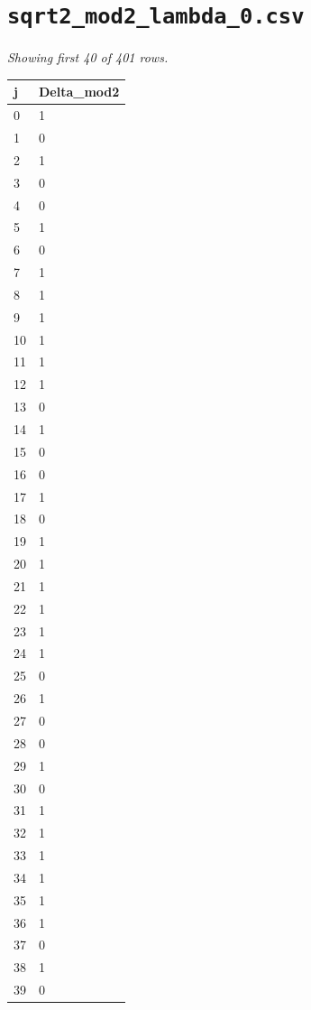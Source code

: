 \documentclass[10pt]{article}
\begin{document}
\section*{\texttt{sqrt2\_mod2\_lambda\_0.csv}}
\noindent\textit{Showing first 40 of 401 rows.}\par\medskip
{\footnotesize
\begin{longtable}{@{}ll@{}}
\toprule
\textbf{j} & \textbf{Delta\_mod2} \\
\midrule\endhead
0 & 1 \\
1 & 0 \\
2 & 1 \\
3 & 0 \\
4 & 0 \\
5 & 1 \\
6 & 0 \\
7 & 1 \\
8 & 1 \\
9 & 1 \\
10 & 1 \\
11 & 1 \\
12 & 1 \\
13 & 0 \\
14 & 1 \\
15 & 0 \\
16 & 0 \\
17 & 1 \\
18 & 0 \\
19 & 1 \\
20 & 1 \\
21 & 1 \\
22 & 1 \\
23 & 1 \\
24 & 1 \\
25 & 0 \\
26 & 1 \\
27 & 0 \\
28 & 0 \\
29 & 1 \\
30 & 0 \\
31 & 1 \\
32 & 1 \\
33 & 1 \\
34 & 1 \\
35 & 1 \\
36 & 1 \\
37 & 0 \\
38 & 1 \\
39 & 0 \\
\bottomrule
\end{longtable}}
\end{document}
